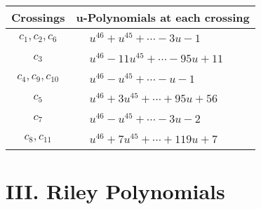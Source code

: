 \documentclass[1p]{elsarticle_modified}
\theoremstyle{definition}
\begin{document}
\begin{tabular}{m{50pt}|m{274pt}}
Crossings & \hspace{64pt}u-Polynomials at each crossing \\
\hline $$\begin{aligned}c_{1},c_{2},c_{6}\end{aligned}$$&$\begin{aligned}
&u^{46}+u^{45}+\cdots-3 u-1
\end{aligned}$\\
\hline $$\begin{aligned}c_{3}\end{aligned}$$&$\begin{aligned}
&u^{46}-11 u^{45}+\cdots-95 u+11
\end{aligned}$\\
\hline $$\begin{aligned}c_{4},c_{9},c_{10}\end{aligned}$$&$\begin{aligned}
&u^{46}- u^{45}+\cdots- u-1
\end{aligned}$\\
\hline $$\begin{aligned}c_{5}\end{aligned}$$&$\begin{aligned}
&u^{46}+3 u^{45}+\cdots+95 u+56
\end{aligned}$\\
\hline $$\begin{aligned}c_{7}\end{aligned}$$&$\begin{aligned}
&u^{46}- u^{45}+\cdots-3 u-2
\end{aligned}$\\
\hline $$\begin{aligned}c_{8},c_{11}\end{aligned}$$&$\begin{aligned}
&u^{46}+7 u^{45}+\cdots+119 u+7
\end{aligned}$\\
\hline
\end{tabular}\newpage\renewcommand{\arraystretch}{1}
\centering \section*{ III. Riley Polynomials}
\end{document}
